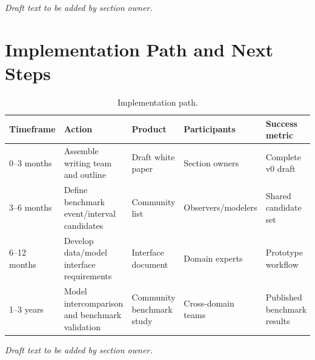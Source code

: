 \documentclass[
  draft
]{agujournal2025}
\begin{document}
\noindent\textit{Draft text to be added by section owner.}

\section{Implementation Path and Next Steps}

\begin{table}[h]
\caption{Implementation path.}
\label{tab:implementation-path}
\centering
\begin{tabular}{p{} p{} p{} p{} p{}}
\hline
Timeframe & Action & Product & Participants & Success metric \\
\hline
0--3 months & Assemble writing team and outline & Draft white paper & Section owners & Complete v0 draft \\
3--6 months & Define benchmark event/interval candidates & Community list & Observers/modelers & Shared candidate set \\
6--12 months & Develop data/model interface requirements & Interface document & Domain experts & Prototype workflow \\
1--3 years & Model intercomparison and benchmark validation & Community benchmark study & Cross-domain teams & Published benchmark results \\
\hline
\end{tabular}
\end{table}

\noindent\textit{Draft text to be added by section owner.}

\end{document}
